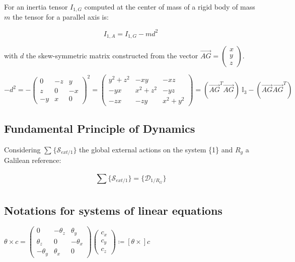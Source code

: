 \documentclass[\main/main.tex]{subfiles}
\begin{document}
For an inertia tensor $I_{1, G}$ computed at the center of mass of a rigid body of mass $m$ the tensor for a parallel axis is:

\begin{equation}
 \label{pat}
 I_{1, A} = I_{1, G} - m d^2
\end{equation}

with $d$ the skew-symmetric matrix constructed from the vector $\overrightarrow{AG} = \begin{pmatrix}
x \\
y \\
z
\end{pmatrix}$.

{\centering
 $ -d^2 = -\begin{pmatrix}
 0 & -z & y \\
 z & 0 & -x \\
 -y & x & 0
 \end{pmatrix}^2
 = \begin{pmatrix}
 y^2 + z^2 & -xy & -xz \\
 -yx & x^2 + z^2 & -yz \\
 -zx & -zy & x^2 + y^2
 \end{pmatrix}
 = (\overrightarrow{AG}^T \overrightarrow{AG}) \ \mathbb{I}_3 - (\overrightarrow{AG} \overrightarrow{AG}^T)$
 \par}


\subsection{Fundamental Principle of Dynamics}

Considering $\sum_{}^{} \{ \mathcal{S}_{ext/1} \}$ the global external actions on the system \{1\} and $R_g$ a Galilean reference:

\begin{equation}
 \sum_{}^{} \{ \mathcal{S}_{ext/1} \} = \{ \mathcal{D}_{1/R_G} \}
 \label{fdp}
\end{equation}


\subsection{Notations for systems of linear equations}

{\centering
 $ \theta \times c =
 \begin{pmatrix}
  0         & -\theta_z & \theta_y  \\
  \theta_z  & 0         & -\theta_x \\
  -\theta_y & \theta_x  & 0
 \end{pmatrix}
 \begin{pmatrix}
  c_x \\
  c_y \\
  c_z
 \end{pmatrix}
 \coloneqq \left[ \theta \times \right] c$
 \par}
\end{document}
